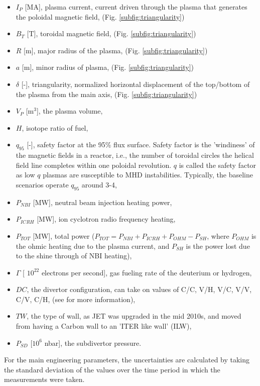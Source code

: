 \documentclass[a4paper, twoside, final, 12pt]{article}
\begin{document}
\begin{itemize}
	\item $I_P$ [MA], plasma current, current driven through the plasma that generates the poloidal magnetic field, (Fig. \ref{subfig:triangularity})
	\item $B_T$ [T], toroidal magnetic field, (Fig. \ref{subfig:triangularity})
	\item $R$ [m], major radius of the plasma, (Fig. \ref{subfig:triangularity})
	\item $a$ [m], minor radius of plasma, (Fig. \ref{subfig:triangularity})
	\item $\delta$ [-], triangularity, normalized horizontal displacement of the top/bottom of the plasma from the main axis, (Fig. \ref{subfig:triangularity})
	\item $V_P$ [m$^3$], the plasma volume,
	\item $H$, isotope ratio of fuel,
	\item $q_{95}$ [-], safety factor at the 95\% flux surface. Safety factor is the 'windiness' of the magnetic fields in a reactor, i.e., the  number of toroidal circles the helical field line completes within one poloidal revolution. $q$ is called the safety factor as low $q$ plasmas are susceptible to MHD instabilities. Typically, the baseline scenarios operate  $q_{95}$ around 3-4,
	\item $P_{NBI}$ [MW], neutral beam injection heating power,
	\item $P_{ICRH}$ [MW], ion cyclotron radio frequency heating, 
	\item $P_{TOT}$ [MW], total power ($P_{TOT} = P_{NBI}+ P_{ICRH} + P_{OHM} - P_{SH}$, where $P_{OHM}$ is the ohmic heating due to the plasma current, and $P_{SH}$ is the power lost due to the shine through of NBI heating),
	\item $\Gamma$ [ $10^{22}$ electrons per second], gas fueling rate of the deuterium or hydrogen,  
	\item $DC$, the divertor configuration, can take on values of C/C, V/H, V/C, V/V, C/V, C/H, (see \cite{Frassinetti_2020} for more information),
	\item $TW$, the type of wall, as JET was upgraded in the mid 2010s, and moved from having a Carbon wall to an 'ITER like wall' (ILW),
	\item $P_{SD}$ [$10^6$ nbar], the subdivertor pressure.
\end{itemize}


For the main engineering parameters, the uncertainties are calculated by taking the standard deviation of the values over the time period in which the measurements were taken. 
\end{document}
